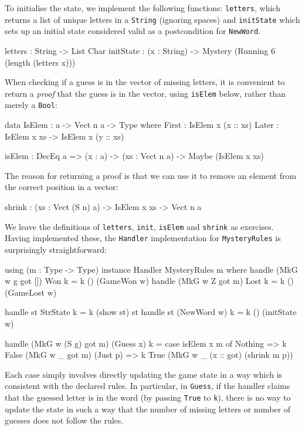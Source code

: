 To initialise the state, we implement the following functions: \texttt{letters},
which returns a list of unique letters in a \texttt{String} (ignoring spaces)
and \texttt{initState} which sets up an initial state considered valid as a
postcondition for \texttt{NewWord}.

\begin{code}
letters : String -> List Char
initState : (x : String) -> Mystery (Running 6 (length (letters x)))
\end{code}

\noindent
When checking if a guess is in the vector of missing letters, it is convenient
to return a \emph{proof} that the guess is in the vector, using \texttt{isElem}
below, rather than merely a \texttt{Bool}:

\begin{code}
data IsElem : a -> Vect n a -> Type where
     First : IsElem x (x :: xs)
     Later : IsElem x xs -> IsElem x (y :: xs)

isElem : DecEq a => (x : a) -> (xs : Vect n a) -> Maybe (IsElem x xs)
\end{code}

\noindent
The reason for returning a proof is that we can use it to remove an element
from the correct position in a vector:

\begin{code}
shrink : (xs : Vect (S n) a) -> IsElem x xs -> Vect n a
\end{code}

\noindent
We leave the definitions of \texttt{letters}, \texttt{init}, \texttt{isElem}
and \texttt{shrink} as exercises. Having implemented these, the \texttt{Handler}
implementation for \texttt{MysteryRules} is surprisingly straightforward:

\begin{code}
using (m : Type -> Type)
  instance Handler MysteryRules m where
    handle (MkG w g got []) Won k = k () (GameWon w)
    handle (MkG w Z got m) Lost k = k () (GameLost w)
  
    handle st StrState k = k (show st) st
    handle st (NewWord w) k = k () (initState w)
  
    handle (MkG w (S g) got m) (Guess x) k =
        case isElem x m of
             Nothing => k False (MkG w _ got m)
             (Just p) => k True (MkG w _ (x :: got) (shrink m p))
\end{code}

\noindent
Each case simply involves directly updating the game state in a way which
is consistent with the declared rules. In particular, in \texttt{Guess}, if
the handler claims that the guessed letter is in the word (by passing
\texttt{True} to \texttt{k}), there is no way to update the state in such
a way that the number of missing letters or number of guesses does not
follow the rules.

